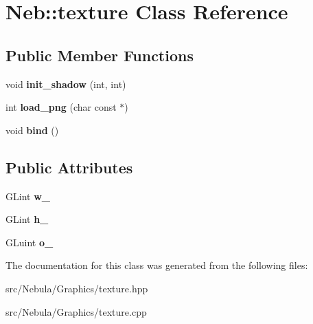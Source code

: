 \hypertarget{classNeb_1_1texture}{\section{\-Neb\-:\-:texture \-Class \-Reference}
\label{classNeb_1_1texture}
}
\subsection*{\-Public \-Member \-Functions}
\begin{DoxyCompactItemize}
\item 
\hypertarget{classNeb_1_1texture_a54de9aed503f8a506c4f075704e57342}{void {\bfseries init\-\_\-shadow} (int, int)}\label{classNeb_1_1texture_a54de9aed503f8a506c4f075704e57342}

\item 
\hypertarget{classNeb_1_1texture_aa41352eec52619c4f28829984f425e35}{int {\bfseries load\-\_\-png} (char const $\ast$)}\label{classNeb_1_1texture_aa41352eec52619c4f28829984f425e35}

\item 
\hypertarget{classNeb_1_1texture_a3854975201918ef4a98a87410c8721f3}{void {\bfseries bind} ()}\label{classNeb_1_1texture_a3854975201918ef4a98a87410c8721f3}

\end{DoxyCompactItemize}
\subsection*{\-Public \-Attributes}
\begin{DoxyCompactItemize}
\item 
\hypertarget{classNeb_1_1texture_a5906c4fa0e792b2248962d2dd06508d7}{\-G\-Lint {\bfseries w\-\_\-}}\label{classNeb_1_1texture_a5906c4fa0e792b2248962d2dd06508d7}

\item 
\hypertarget{classNeb_1_1texture_ad7caf7e0f403d4e13fde5bd19761dd8a}{\-G\-Lint {\bfseries h\-\_\-}}\label{classNeb_1_1texture_ad7caf7e0f403d4e13fde5bd19761dd8a}

\item 
\hypertarget{classNeb_1_1texture_a200e3dfdfa5616cba3ef97b63cbe3a54}{\-G\-Luint {\bfseries o\-\_\-}}\label{classNeb_1_1texture_a200e3dfdfa5616cba3ef97b63cbe3a54}

\end{DoxyCompactItemize}


\-The documentation for this class was generated from the following files\-:\begin{DoxyCompactItemize}
\item 
src/\-Nebula/\-Graphics/texture.\-hpp\item 
src/\-Nebula/\-Graphics/texture.\-cpp\end{DoxyCompactItemize}

